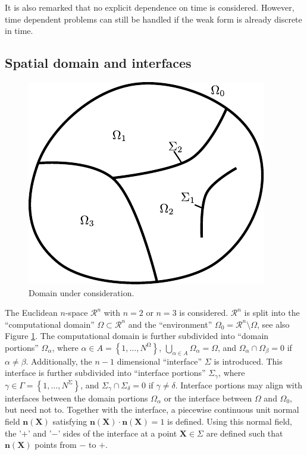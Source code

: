 \documentclass[pdftex,a4paper,12pt,abstracton]{scrartcl}
\begin{document}
It is also remarked that no explicit dependence on time is considered. However, time dependent problems can still be handled if the weak form is already discrete in time.

\subsection{Spatial domain and interfaces}
\begin{figure}[htb]
\centering
\includegraphics[scale=1.0]{graphics/domain.pdf}
\caption{Domain under consideration.}
\label{domain}
\end{figure}
The Euclidean $n$-space $\mathcal{R}^n$ with $n=2$ or $n=3$ is considered. $\mathcal{R}^n$ is split into the ``computational domain'' $\Omega \subset \mathcal{R}^n$ and the ``environment'' $\Omega_0 = \mathcal{R}^n \setminus \Omega$, see also Figure \ref{domain}. The computational domain is further subdivided into ``domain portions'' $\Omega_\alpha$, where $\alpha \in A=\left\{1, \hdots, N^\mathrm{\Omega}\right\}$, $\bigcup_{\alpha \in A} \Omega_\alpha = \Omega$, and $\Omega_\alpha \cap \Omega_\beta = 0$ if $\alpha\neq \beta$. Additionally, the $n-1$ dimensional ``interface'' $\Sigma$ is introduced. This interface is further subdivided into ``interface portions'' $\Sigma_\gamma$, where $\gamma \in \Gamma=\left\{1, \hdots, N^\mathrm{\Sigma}\right\}$, and $\Sigma_\gamma \cap \Sigma_\delta = 0$ if $\gamma\neq \delta$. Interface portions may align with interfaces between the domain portions $\Omega_\alpha$ or the interface between $\Omega$ and $\Omega_0$, but need not to. Together with the interface, a piecewise continuous unit normal field $\boldsymbol{n}(\boldsymbol{X})$ satisfying $\boldsymbol{n}(\boldsymbol{X})\cdot\boldsymbol{n}(\boldsymbol{X}) = 1$ is defined. Using this normal field, the '$+$' and '$-$' sides of the interface at a point $\boldsymbol{X} \in \Sigma$ are defined such that $\boldsymbol{n}(\boldsymbol{X})$ points from $-$ to $+$.
\end{document}
